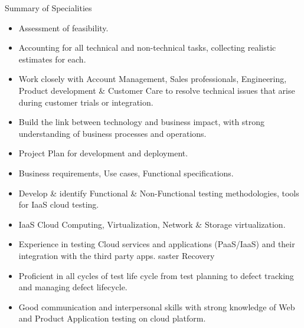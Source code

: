 \documentclass[a4paper,12pt]{article}
\begin{document}
\begin{resumesummary}{Summary of Specialities}
\begin{itemize}
  \item Assessment of feasibility.
  \item Accounting for all technical and non-technical tasks, collecting realistic estimates for each.
  \item Work closely with Account Management, Sales professionals, Engineering, Product development \& Customer Care to resolve technical issues that arise during customer trials or integration.
  \item Build the link between technology and business impact, with strong understanding of business processes and operations.
  \item Project Plan for development and deployment.
  \item Business requirements, Use cases, Functional specifications.
  \item Develop \& identify Functional \& Non-Functional testing methodologies, tools for IaaS cloud testing.
  \item IaaS Cloud Computing, Virtualization, Network \& Storage virtualization.
  \item Experience in testing Cloud services and applications (PaaS/IaaS) and their integration with the third party apps.
saster Recovery
  \item Proficient in all cycles of test life cycle from test planning to defect tracking and managing defect lifecycle.
  \item Good communication and interpersonal skills with strong knowledge of Web and Product Application testing on cloud platform.
\newline
\end{itemize}
\end{resumesummary}
\end{document}
